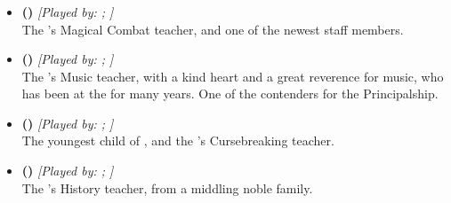 \documentclass[blue]{GL2020}
\begin{document}
\subsubsection*{\pFarm{}}
\begin{itemize}
    \item \textbf{\cInterpol{\full} (\cInterpol{\MYcharpronouns})} \textit{[Played by: \cInterpol{\MYplayer}; \cInterpol{\MYplayerpronouns}]}\\ The \pSc{}'s Magical Combat teacher, and one of the newest staff members.
    
    \item \textbf{\cMusic{\full} (\cMusic{\MYcharpronouns})} \textit{[Played by: \cMusic{\MYplayer}; \cMusic{\MYplayerpronouns}]}\\ The \pSc{}'s Music teacher, with a kind heart and a great reverence for music, who has been at the \pSc{} for many years. One of the contenders for the Principalship.
    
    \item \textbf{\cPrince{\full} (\cPrince{\MYcharpronouns})} \textit{[Played by: \cPrince{\MYplayer}; \cPrince{\MYplayerpronouns}]}\\ The youngest child of \cQueen{\full}, and the \pSc{}'s Cursebreaking teacher.
   		 
    \item \textbf{\cHistory{\full} (\cHistory{\MYcharpronouns})} \textit{[Played by: \cHistory{\MYplayer}; \cHistory{\MYplayerpronouns}]}\\ The \pSc{}'s History teacher, from a middling noble family.
\end{itemize}
\end{document}

